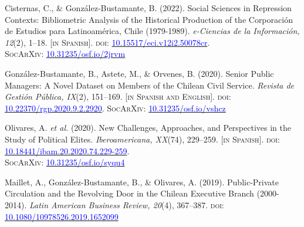 \begin{publications}

\begin{benumerate}{9}

\item{\small Cisternas, C., \& González-Bustamante, B. (2022). Social Sciences in Repression Contexts: Bibliometric Analysis of the Historical Production of the Corporación de Estudios para Latinoamérica, Chile (1979-1989). {\itshape e-Ciencias de la Información, 12}(2), 1--18. {\footnotesize \scshape [in Spanish]}. {\scshape doi:} \href{https://doi.org/10.15517/eci.v12i2.50078}{\textcolor{blue}{10.15517/eci.v12i2.50078cr}}. \\ {\scshape \footnotesize SocArXiv:} \href{https://doi.org/10.31235/osf.io/2jrvm}{\textcolor{blue}{10.31235/osf.io/2jrvm}}}\vspace{1mm} %

\item{\small González-Bustamante, B., Astete, M., \& Orvenes, B. (2020). Senior Public Managers: A Novel Dataset on Members of the Chilean Civil Service. {\itshape Revista de Gestión Pública, IX}(2), 151--169. {\footnotesize \scshape [in Spanish and English]}. {\scshape doi}: \href{https://doi.org/10.22370/rgp.2020.9.2.2920}{\textcolor{blue}{10.22370/rgp.2020.9.2.2920}}. {\scshape \footnotesize SocArXiv}: \href{https://doi.org/10.31235/osf.io/vshcz}{\textcolor{blue}{10.31235/osf.io/vshcz}}}\vspace{1mm}

\item{\small Olivares, A. {\itshape et al.} (2020). New Challenges, Approaches, and Perspectives in the Study of Political Elites. {\itshape Iberoamericana, XX}(74), 229--259. {\footnotesize \scshape [in Spanish]}. {\scshape doi}: \href{https://doi.org/10.18441/ibam.20.2020.74.229-259}{\textcolor{blue}{10.18441/ibam.20.2020.74.229-259}}. \\{\scshape \footnotesize SocArXiv}: \href{https://doi.org/10.31235/osf.io/syqu4}{\textcolor{blue}{10.31235/osf.io/syqu4}}}\vspace{1mm}

\item{\small Maillet, A., González-Bustamante, B., \& Olivares, A. (2019). Public-Private Circulation and the Revolving Door in the Chilean Executive Branch (2000-2014). {\itshape Latin American Business Review, 20}(4), 367--387. {\scshape doi}: \href{https://doi.org/10.1080/10978526.2019.1652099}{\textcolor{blue}{10.1080/10978526.2019.1652099}}}\vspace{1mm}


\end{benumerate}
\end{publications}
